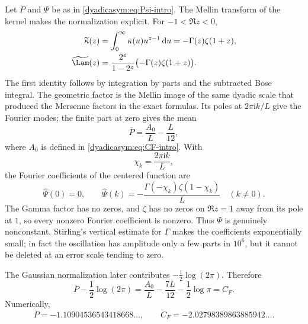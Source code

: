 \documentclass[11pt,oneside]{article}
\theoremstyle{definition}
\theoremstyle{remark}
\newcommand{\ii}{\mathrm i}
\newcommand{\dd}{\,\mathrm d}
\begin{document}
Let $\overline P$ and $\Psi$ be as in \eqref{dyadicasym:eq:Psi-intro}.  The Mellin transform of the
kernel makes the normalization explicit.  For $-1<\Re z<0$,
\begin{align}
 \widetilde\kappa(z)
 &=\int_0^\infty\kappa(u)u^{z-1}\dd u
   =-\Gamma(z)\zeta(1+z),
 \label{dyadicasym:eq:kappa-mellin}\\
 \widetilde\Lam(z)
 &=\frac{2^z}{1-2^z}\bigl(-\Gamma(z)\zeta(1+z)\bigr).
 \label{dyadicasym:eq:Lambda-mellin}
\end{align}
The first identity follows by integration by parts and the subtracted Bose integral.  The
geometric factor is the Mellin image of the same dyadic scale that produced the Mersenne
factors in the exact formulas.  Its poles at $2\pi\ii k/L$ give the Fourier modes; the
finite part at zero gives the mean
\begin{equation}
 \overline P=\frac{A_0}{L}-\frac L{12},                     \label{dyadicasym:eq:P-mean}
\end{equation}
where $A_0$ is defined in \eqref{dyadicasym:eq:CF-intro}.  With
\begin{equation}
 \chi_k=\frac{2\pi\ii k}{L},                                \label{dyadicasym:eq:chi}
\end{equation}
the Fourier coefficients of the centered function are
\begin{equation}
 \widehat\Psi(0)=0,
 \qquad
 \boxed{
 \widehat\Psi(k)=-\frac{\Gamma(-\chi_k)\zeta(1-\chi_k)}L}
 \quad(k\ne0).                                             \label{dyadicasym:eq:Psi-Fourier-report}
\end{equation}
The Gamma factor has no zeros, and $\zeta$ has no zeros on $\Re z=1$ away from its pole at
$1$, so every nonzero Fourier coefficient is nonzero.  Thus $\Psi$ is genuinely nonconstant.
Stirling's vertical estimate for $\Gamma$ makes the coefficients exponentially small; in
fact the oscillation has amplitude only a few parts in $10^6$, but it cannot be deleted at an
error scale tending to zero.

The Gaussian normalization later contributes $-\tfrac12\log(2\pi)$.  Therefore
\begin{equation}
 \overline P-\frac12\log(2\pi)
 =\frac{A_0}{L}-\frac{7L}{12}-\frac12\log\pi
 =C_F.                                                       \label{dyadicasym:eq:CF-from-P}
\end{equation}
Numerically,
\begin{equation}
 \overline P=-1.10904536543418668\ldots,
 \qquad
 C_F=-2.02798389863885942\ldots.                            \label{dyadicasym:eq:constants-numeric}
\end{equation}
\end{document}
